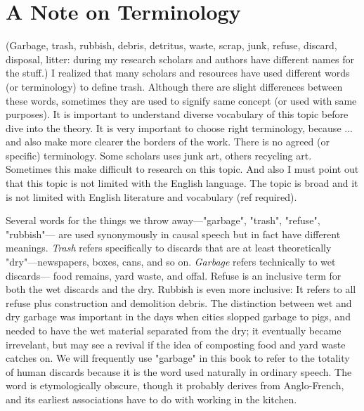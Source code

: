 

\section{A Note on Terminology}
(Garbage, trash, rubbish, debris, detritus, waste, scrap, junk, refuse, discard, disposal, litter: during my research scholars and authors have different names for the stuff.) I realized that many scholars and resources have used different words (or terminology) to define trash. Although there are slight differences between these words, sometimes they are used to signify same concept (or used with same purposes). It is important to understand diverse vocabulary of this topic before dive into the theory. It is very important to choose right terminology, because ... and also make more clearer the borders of the work. There is no agreed (or specific) terminology. Some scholars uses junk art, others recycling art. Sometimes this make difficult to research on this topic. And also I must point out that this topic is not limited with the English language. The topic is broad and it is not limited with English literature and vocabulary (ref required). 

Several words for the things we throw away---"garbage", "trash", "refuse", "rubbish"--- are used synonymously in causal speech but in fact have different meanings. \textit{Trash} refers specifically to discards that are at least theoretically "dry"---newspapers, boxes, cans, and so on. \textit{Garbage} refers technically to wet discards--- food remains, yard waste, and offal. Refuse is an inclusive term for both the wet discards and the dry. Rubbish is even more inclusive: It refers to all refuse plus construction and demolition debris. The distinction between wet and dry garbage was important in the days when cities slopped garbage to pigs, and needed to have the wet material separated from the dry; it eventually became irrevelant, but may see a revival if the idea of composting food and yard waste catches on. We will frequently use "garbage" in this book to refer to the totality of human discards because it is the word used naturally in ordinary speech. The word is etymologically obscure, though it probably derives from Anglo-French, and its earliest associations have to do with working in the kitchen.

